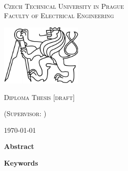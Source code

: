 \documentclass[a4paper,twoside,english,english,openright,cleardoublepage=empty,BCOR10mm,DIV11]{scrreprt}
\newcommand{\noun}[1]{\textsc{#1}}
\begin{document}
~\thispagestyle{empty}\begin{center}\vspace{10mm}


\textsf{\textsc{\noun{\LARGE Czech Technical University in Prague}}}\\
\vspace{0.5em}
\textsf{\textsc{\noun{\LARGE Faculty of Electrical Engineering}}}\\
\vspace*{1em}
\textsf{\textsc{\noun{\Large \Department}}}\vspace{15mm}


\includegraphics[width=0.3\textwidth]{lev}\vspace{15mm}

\textsf{\textsc{\noun{\huge Diploma Thesis [draft]}}}{\huge \par}

\vspace{10mm}


\textsf{\textsc{\noun{\LARGE \Title}}}{\LARGE \par}

\vspace*{\fill}

\textsf{\textsc{\noun{\large \AuthorName}}}{\large \par}
\textsf{\textsc{\noun{\large (Supervisor: \SupervisorName)}}}{\large \par}

\vspace{10mm}

\textsf{\textsc{\noun{\large \today}}}{\large \par}


\end{center} 



\vspace{10mm}

\clearpage{}
{\small \thispagestyle{plain} }{\small \par}
{\small \textbf{Abstract}  }{\small \par}
\vspace{5mm}
{\small \textbf{Keywords} \Keywords}{\small \par}
\vspace{5mm}
\clearpage{}
\thispagestyle{empty}{\small \tableofcontents{}%
\cleardoublepage{}
}{\small \par}
\end{document}
